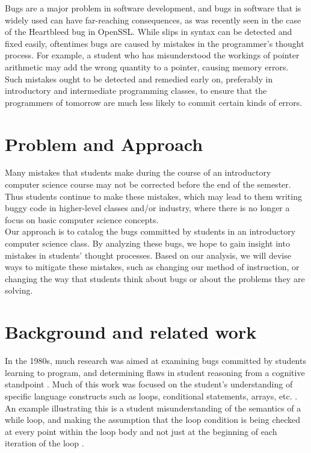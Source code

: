 \documentclass{sig-alternate}
\begin{document}
Bugs are a major problem in software development, and bugs in software that is widely used can have far-reaching consequences, as was recently seen in the case of the Heartbleed bug in OpenSSL. While slips in syntax can be detected and fixed easily, oftentimes bugs are caused by mistakes in the programmer's thought process. For example, a student who has misunderstood the workings of pointer arithmetic may add the wrong quantity to a pointer, causing memory errors. Such mistakes ought to be detected and remedied early on, preferably in introductory and intermediate programming classes, to ensure that the programmers of tomorrow are much less likely to commit certain kinds of errors. 

\section{Problem and Approach}
Many mistakes that students make during the course of an introductory computer science course may not be corrected before the end of the semester. Thus students continue to make these mistakes, which may lead to them writing buggy code in higher-level classes and/or industry, where there is no longer a focus on basic computer science concepts.\\

Our approach is to catalog the bugs committed by students in an introductory computer science class. By analyzing these bugs, we hope to gain insight into mistakes in students' thought processes. Based on our analysis, we will devise ways to mitigate these mistakes, such as changing our method of instruction, or changing the way that students think about bugs or about the problems they are solving.

\section{Background and related work}
\label{sec:background}

In the 1980s, much research was aimed at examining bugs committed by students learning to program, and determining flaws in student reasoning from a cognitive standpoint \cite{JoniSolowayGoldmanEhrlich83, PutnamSleemanBaxterKuspa86, SpohrerSoloway86, Pea86}. Much of this work was focused on the student's understanding of specific language constructs such as loops, conditional statements, arrays, etc. \cite{JoniSolowayGoldmanEhrlich83, PutnamSleemanBaxterKuspa86, Pea86}. An example illustrating this is a student misunderstanding of the semantics of a while loop, and making the assumption that the loop condition is being checked at every point within the loop body and not just at the beginning of each iteration of the loop \cite{Pea86}.\\
\end{document}
